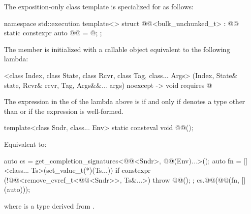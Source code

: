 \pnum
The exposition-only class template 
is specialized for  as follows:
\begin{codeblock}
namespace std::execution {
  template<>
  struct @@<bulk_unchunked_t> : @@ {
    static constexpr auto @@ = @\seebelow@;
  };
}
\end{codeblock}
The member 
is initialized with a callable object equivalent to the following lambda:
\begin{codeblock}
[]<class Index, class State, class Rcvr, class Tag, class... Args>
  (Index, State& state, Rcvr& rcvr, Tag, Args&&... args) noexcept
  -> void requires @
\end{codeblock}
The expression in the  of the lambda above
is  if and only
if  denotes a type other than  or
if the expression  is well-formed.

\begin{itemdecl}
template<class Sndr, class... Env>
  static consteval void @@();
\end{itemdecl}

\begin{itemdescr}
\pnum
\effects
Equivalent to:
\begin{codeblock}
auto cs = get_completion_signatures<@@<Sndr>, @@(Env)...>();
auto fn = []<class... Ts>(set_value_t(*)(Ts...)) {
  if constexpr (!@@<remove_cvref_t<@@<Sndr>>, Ts&...>)
    throw @@();
};
cs.@@(@@(fn, [](auto){}));
\end{codeblock}
where  is
a type derived from .
\end{itemdescr}

